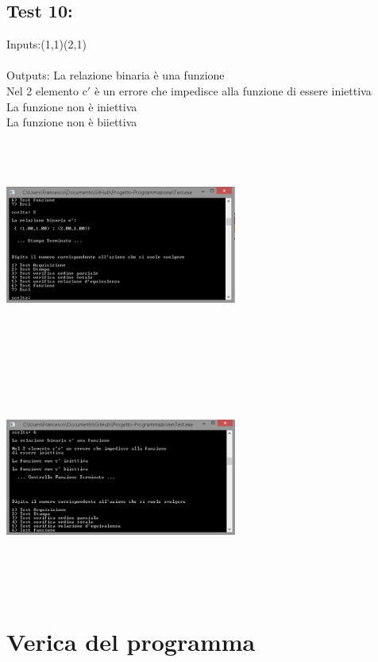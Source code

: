 \documentclass[11pt, a4paper, titlepage, block]{article}
\begin{document}
	\subsection{Test 10:}
	Inputs:(1,1)(2,1)\\
	\\
	Outputs: La relazione binaria \`e  una funzione\\
	Nel 2 elemento c$'$ \`e un errore che impedisce alla funzione di essere iniettiva\\
	La funzione non \`e  iniettiva\\
	La funzione non \`e  biiettiva\\
	\includegraphics[width=3in,height=3in,viewport=0 0 300 300]{../Screenshots/Test10Input.png}
	\\
	\includegraphics[width=3in,height=3in,viewport=0 0 300 300]{../Screenshots/Test10Output.PNG}
	\newpage
	\section{Verica del programma}
\end{document}
